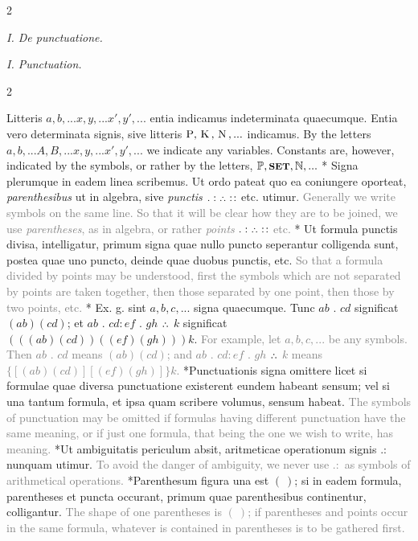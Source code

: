 \documentclass{book}
\newcommand{\pppNoSpace}{\leavevmode\lower0ex\hbox{.}\kern-0.1em\raise0.7ex\hbox{.}\kern-0.1em\lower0ex\hbox{.}} %
\newcommand{\K}{\mathop{\thinspace \text{K} \thinspace}}
\newcommand{\N}{\mathop{\thinspace \text{N} \thinspace}}
\newcommand{\setOfSets}{\mathord{\text{{\footnotesize \textbf{SET}}}}}
\newcommand\irrelavent[1]{\textcolor{gray}{#1}}
\newcommand\peanoHeadingSmall[1]{ \vspace{0.75cm} \textit{#1} \nopagebreak[4]

\vspace{0.25cm} \nopagebreak[1]}
\newenvironment{translateTwoCol}
               { %
                 \columnratio{0.5, 0.5}
                 \begin{paracol}{2}
                 \newcommand{\LAT}{\switchcolumn[0]*}
                 \newcommand{\ENG}{\switchcolumn[1]}
               }
               { %
                 \let\ENG\undefined
                 \let\LAT\undefined
                 \end{paracol}
               }
\begin{document}
\begin{translateTwoCol}
\centering
{}
{}
\peanoHeadingSmall{I. De punctuatione.}
\ENG
\peanoHeadingSmall{I. Punctuation.}
\end{translateTwoCol}

\begin{translateTwoCol}
Litteris $a,b,... x,y,... x', y',...$ entia indicamus indeterminata quaecumque. Entia vero determinata signis, sive litteris $\text{P}, \K, \N,...$ indicamus.
\ENG
By the letters $a,b,... A,B,... x,y,... x', y',...$ we indicate any variables. Constants are, however, indicated by the symbols, or rather by the letters, $\mathbb{P}, \setOfSets, \mathbb{N},...$ 
\LAT
Signa plerumque in eadem linea scribemus. Ut ordo pateat quo ea coniungere oporteat, \emph{parenthesibus} ut in algebra, sive \emph{punctis} $. : \pppNoSpace :\hspace{0.1em}:$ etc. utimur.
\ENG
\irrelavent{Generally we write symbols on the same line. So that it will be clear how they are to be joined, we use \emph{parentheses}, as in algebra, or rather \emph{points} $. : \pppNoSpace :\hspace{0.1em}:$ etc.}
\LAT
Ut formula punctis divisa, intelligatur, primum signa quae nullo puncto seperantur colligenda sunt, postea quae uno puncto, deinde quae duobus punctis, etc.
\ENG
\irrelavent{So that a formula divided by points may be understood, first the symbols which are not separated by points are taken together, then those separated by one point, then those by two points, etc.}
\LAT
Ex. g. sint $a,b,c,...$ signa quaecumque. Tunc $ab$ $.$ $cd$ significat $(ab)(cd)$; et $ab$ $.$ $cd:ef$ $.$ $gh$ $\pppNoSpace$ $k$ significat $(((ab)(cd))((ef)(gh)))k$.
\ENG
\irrelavent{For example, let $a,b,c,...$ be any symbols. Then $ab$ $.$ $cd$ means $(ab)(cd)$; and $ab$ $.$ $cd:ef$ $.$ $gh$ $\pppNoSpace$ $k$ means $\{[(ab)(cd)][(ef)(gh)]\}k$.}
\LAT Punctuationis signa omittere licet si formulae quae diversa punctuatione existerent eundem habeant sensum; vel si una tantum formula, et ipsa quam scribere volumus, sensum habeat.
\ENG \irrelavent{The symbols of punctuation may be omitted if formulas having different punctuation have the same meaning, or if just one formula, that being the one we wish to write, has meaning.}
\LAT Ut ambiguitatis periculum absit, aritmeticae operationum signis $. :$ nunquam utimur.
\ENG \irrelavent{To avoid the danger of ambiguity, we never use $. :$ as symbols of arithmetical operations.}
\LAT Parenthesum figura una est $( \ )$; si in eadem formula, parentheses et puncta occurant, primum quae parenthesibus continentur, colligantur.
\ENG \irrelavent{The shape of one parentheses is $( \ )$; if parentheses and points occur in the same formula, whatever is contained in parentheses is to be gathered first.}  %
\end{translateTwoCol}
\end{document}
